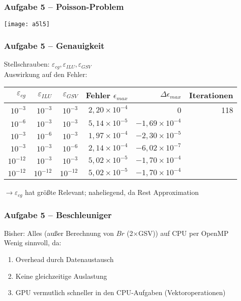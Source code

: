 \documentclass[german,notes,18pt]{beamer}
\begin{document}
	\begin{frame}
		\frametitle{Aufgabe 5 -- Poisson-Problem}
		\vspace{-10em}
		\begin{center}
			\texttt{[image: a5l5]}
		\end{center}
	\end{frame}
	\begin{frame}
		\frametitle{Aufgabe 5 -- Genauigkeit}
		Stellschrauben: $\varepsilon_{cg}, \varepsilon_{ILU}, \varepsilon_{GSV}$ \\
		\vspace{2em}
		Auswirkung auf den Fehler:
		\begin{center}
			\begin{tabular}{r|r|r|r|r|r}
				$\varepsilon_{cg}$ & $\varepsilon_{ILU}$ & $\varepsilon_{GSV}$ & Fehler $\epsilon_{max}$ & $\Delta\epsilon_{max}$ & Iterationen \\
				\hline
				$10^{-3}$ & $10^{-3}$ & $10^{-3}$ & $2,20\times10^{-4}$ & 0 & 118 \\
				$10^{-6}$ & $10^{-3}$ & $10^{-3}$ & $5,14\times10^{-5}$ & $-1,69\times10^{-4}$ \\
				$10^{-3}$ & $10^{-6}$ & $10^{-3}$ & $1,97\times10^{-4}$ & $-2,30\times10^{-5}$ \\
				$10^{-3}$ & $10^{-3}$ & $10^{-6}$ & $2,14\times10^{-4}$ & $-6,02\times10^{-7}$ \\
				$10^{-12}$ & $10^{-3}$ & $10^{-3}$ & $5,02\times10^{-5}$ & $-1,70\times10^{-4}$ \\
				$10^{-12}$ & $10^{-12}$ & $10^{-12}$ & $5,02\times10^{-5}$ & $-1,70\times10^{-4}$
			\end{tabular}
		\end{center}
	\vspace{2em}
	$\rightarrow$$\varepsilon_{cg}$ hat größte Relevant; naheliegend, da Rest Approximation
	\end{frame}
	\begin{frame}
		\frametitle{Aufgabe 5 -- Beschleuniger}
		Bisher: Alles (außer Berechnung von $Br$ (2$\times$GSV)) auf CPU per OpenMP \\
		\vspace{2em}
		Wenig sinnvoll, da:
		\begin{enumerate}
			\item Overhead durch Datenaustausch
			\item Keine gleichzeitige Auslastung
			\item GPU vermutlich schneller in den CPU-Aufgaben (Vektoroperationen)
		\end{enumerate}
	\end{frame}
\end{document}
